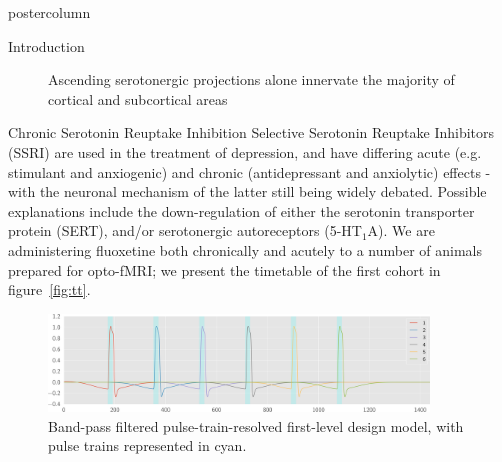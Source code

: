 \documentclass{beamer}
\begin{document}
\begin{frame}
\begin{columns}
\begin{column}{.48\textwidth}
\begin{beamercolorbox}[center]{postercolumn}
{\begin{myblock}{Introduction}
\begin{figure}
\begin{minipage}{0.45\textwidth}
								\caption{Ascending serotonergic projections alone innervate the
								majority of cortical and subcortical areas \cite{Oegren2008}}
							\end{minipage}
						\end{figure}
					\end{myblock}
					\begin{myblock}{Chronic Serotonin Reuptake Inhibition}
						Selective Serotonin Reuptake Inhibitors (SSRI) are used in the
						treatment of depression, and have differing acute (e.g. stimulant
						and anxiogenic) and chronic (antidepressant and anxiolytic)
						effects - with the neuronal mechanism of the latter still being
						widely debated.
						Possible explanations include the down-regulation of either the
						serotonin transporter protein (SERT), and/or serotonergic
						autoreceptors (5-HT$_1$A).
						We are administering fluoxetine both chronically and acutely to a
						number of animals prepared for opto-fMRI; we present the timetable
						of the first cohort in figure~\ref{fig:tt}.
						\vspace{0.5em}
						\begin{figure}
							\begin{minipage}{0.94\textwidth}
								\centering\includegraphics[width=0.9\textwidth]{img/dm.png}
								\caption{Band-pass filtered pulse-train-resolved first-level
										design model, with pulse trains represented in cyan.}
								\label{fig:stim}
							\end{minipage}
						\end{figure}

\end{myblock}}
\end{beamercolorbox}
\end{column}
\end{columns}
\end{frame}
\end{document}
